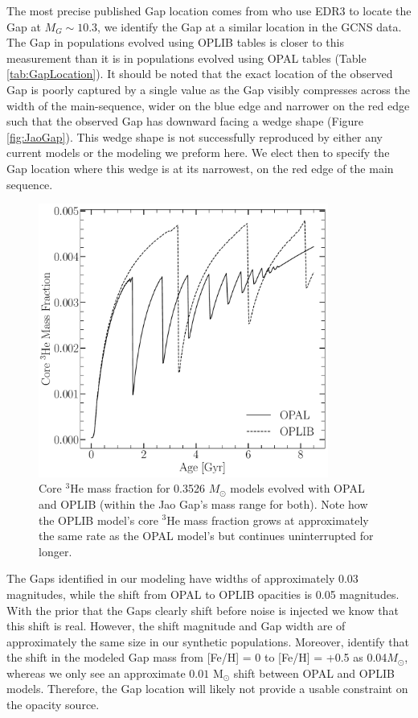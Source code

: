 The most precise published Gap location comes from \citet{Jao2020} who use EDR3
to locate the Gap at $M_{G} \sim 10.3$, we identify the Gap at a similar
location in the GCNS data. The Gap in populations evolved using OPLIB
tables is closer to this measurement than it is in populations evolved using
OPAL tables (Table \ref{tab:GapLocation}). It should be noted that the exact
location of the observed Gap is poorly captured by a single value as the Gap
visibly compresses across the width of the main-sequence, wider on the blue
edge and narrower on the red edge such that the observed Gap has downward
facing a wedge shape (Figure \ref{fig:JaoGap}). This wedge shape is not
successfully reproduced by either any current models or the modeling we preform
here. We elect then to specify the Gap location where this wedge is at its
narrowest, on the red edge of the main sequence.

\begin{figure}
	\centering
	\includegraphics[width=0.85\textwidth]{figures/jaoOpacity/Core3HECompSameMass.pdf}
	\caption{Core $^{3}$He mass fraction for  0.3526 $M_{\odot}$ models evolved
	with OPAL and OPLIB (within the Jao Gap's mass range for both). Note how
	the OPLIB model's core $^{3}$He mass fraction grows at approximately the
	same rate as the OPAL model's but continues uninterrupted for longer.}
	\label{fig:OPALOPLIB3He}
\end{figure}

The Gaps identified in our modeling have widths of approximately 0.03
magnitudes, while the shift from OPAL to OPLIB opacities is 0.05 magnitudes.
With the prior that the Gaps clearly shift before noise is injected we know
that this shift is real. However, the shift magnitude and Gap width are of
approximately the same size in our synthetic populations. Moreover,
\citet{Feiden2021} identify that the shift in the modeled Gap mass from [Fe/H]
= 0 to [Fe/H] = +0.5 as 0.04$M_{\odot}$, whereas we only see an approximate
$0.01$ M$_{\odot}$ shift between OPAL and OPLIB models. Therefore, the
Gap location will likely not provide a usable constraint on the opacity
source.
